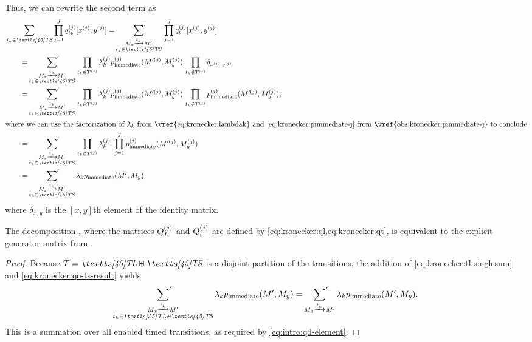 Thus, we can rewrite the second term as
\begin{align}
  &\sum_{t_k \in \TS} \prod_{j = 1}^J q_{t_k}\loc{j}[x\loc{j}, y\loc{j}] =
    \sumprime_{\substack{M_x \xrightarrow{t_k} M' \\ t_k \in \TS}} \,
  \prod_{j = 1}^J q_t\loc{j}[x\loc{j}, y\loc{j}] \\
  &\qquad=\sumprime_{\substack{M_x \xrightarrow{t_k} M' \\ t_k \in
  \TS}} \, \prod_{t_k \in T\loc{j}} \lambda_k\loc{j}
  p_{\text{immediate}}\loc{j}(M^{\prime (j)}, M_y\loc{j}) \, \prod_{t_k
  \notin T\loc{j}} \delta_{x\loc{j}, y\loc{j}} \\
  &\qquad=\sumprime_{\substack{M_x \xrightarrow{t_k} M' \\ t_k \in
  \TS}} \, \prod_{t_k \in T\loc{j}} \lambda_k\loc{j}
  p_{\text{immediate}}\loc{j}(M^{\prime (j)}, M_y\loc{j}) \, \prod_{t_k
  \notin T\loc{j}} p_{\text{immediate}}\loc{j}(M^{\prime (j)},
  M_y\loc{j}) \text, \\
  \intertext{where we can use the factorization of $\lambda_k$
  from \vref{eq:kronecker:lambdak}
  and \cref{eq:kronecker:pimmediate-j}
  from \vref{obs:kronecker:pimmediate-j} to conclude}
  &\qquad=\sumprime_{\substack{M_x \xrightarrow{t_k} M' \\ t_k \in
  \TS}} \, \prod_{t_k \in T\loc{j}} \lambda_k\loc{j} \,\, \prod_{j = 1}^J
  p_{\text{immediate}}\loc{j} (M^{\prime (j)}, M_y\loc{j}) \\
  &\qquad= \sumprime_{\substack{M_x \xrightarrow{t_k} M' \\ t_k \in
  \TS}} \lambda_k p_{\text{immediate}}(M', M_y)
  \text, \label{eq:kronecker:qo-ts-result}
\end{align}
where $\delta_{x,y}$ is the $[x, y]$\thinspace th element of the
identity matrix.

\begin{thm}
  The decomposition ,
  where the matrices $Q_L^{(j)}$ and $Q_t^{(j)}$ are defined by
  \cref{eq:kronecker:ql,eq:kronecker:qt}, is equivalent to the
  explicit generator matrix from
  .
\end{thm}

\begin{proof}
  Because $T = \TL \uplus \TS$ is a disjoint partition of the
  transitions, the addition of \vref{eq:kronecker:tl-singlesum} and
  \vref{eq:kronecker:qo-ts-result} yields
  \begin{equation}
    \sumprime_{\substack{M_x \xrightarrow{t_k} M' \\ t_k \in
        \TL \uplus \TS}} \lambda_k p_{\text{immediate}}(M', M_y) =
    \sumprime_{M_x \xrightarrow{t_k} M'} \lambda_k
    p_{\text{immediate}}(M', M_y) \text.
  \end{equation}
  This is a summation over all enabled timed transitions, as required
  by \cref{eq:intro:qd-element}.
\end{proof}

